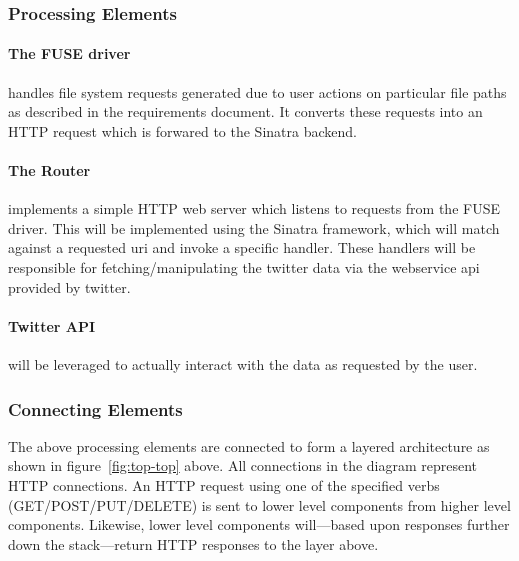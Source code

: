 \subsubsection{Processing Elements}

\paragraph{The FUSE driver} handles file system requests generated due
to user actions on particular file paths as described in the requirements
document. It converts these requests into an HTTP request which is forwared to
the Sinatra backend.

\paragraph{The Router} implements a simple HTTP web server which listens to requests from
the FUSE driver. This will be implemented using the Sinatra framework, which
will match against a requested uri and invoke a specific handler. These handlers
will be responsible for fetching/manipulating the twitter data via the
webservice api provided by twitter.

\paragraph{Twitter API} will be leveraged to actually interact with the data as
requested by the user.

\subsubsection{Connecting Elements}

The above processing elements are connected to form a layered architecture as
shown in figure~\ref{fig:top-top} above. All connections in the diagram
represent HTTP connections. An HTTP request using one of the specified verbs
(GET/POST/PUT/DELETE) is sent to lower level components from higher level
components. Likewise, lower level components will---based upon responses further
down the stack---return HTTP responses to the layer above.


